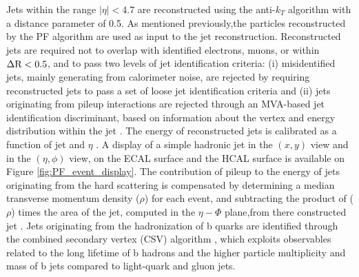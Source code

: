 

Jets within the range \ensuremath{|\eta| < 4.7} are reconstructed using the anti-\ensuremath{k_{T}} algorithm \cite{antikt} with a distance parameter of 0.5. As mentioned previously,the particles reconstructed by the PF algorithm are used as input to the jet reconstruction. Reconstructed jets are required not to overlap with identified electrons, muons, or \hadtau within \ensuremath{\deltar < 0.5}, and to pass two levels of jet identification criteria: (i) misidentified jets, mainly generating from calorimeter noise, are rejected by requiring reconstructed jets to pass a set of loose jet identification criteria \cite{CMS:2010xta} and (ii) jets originating from pileup interactions are rejected through an MVA-based jet identification discriminant, based on information about the vertex and energy distribution within the jet \cite{CMS:2013wea}. The energy of reconstructed jets is calibrated as a function of jet \pt and \ensuremath{\eta} \cite{1748-0221-6-11-P11002}. A display of a simple hadronic jet in the $(x, y)$ view and in the $(\eta,\phi)$ view, on the ECAL surface and the HCAL surface is available on Figure 	\ref{fig:PF_event_display}. The contribution of pileup to the energy of jets originating from the hard scattering is compensated by determining a median transverse momentum density (\ensuremath{\rho}) for each event, and subtracting the product of (\ensuremath{\rho}) times the area of the jet, computed in the \ensuremath{\eta-\Phi} plane,from there constructed jet \pt \cite{Cacciari:2008gn, Cacciari:2007fd}. Jets originating from the hadronization of b quarks are identified through the combined secondary vertex (CSV) algorithm \cite{Chatrchyan:2012jua}, which exploits observables related to the long lifetime of b hadrons and the higher particle multiplicity and mass of b jets compared to light-quark and gluon jets.


